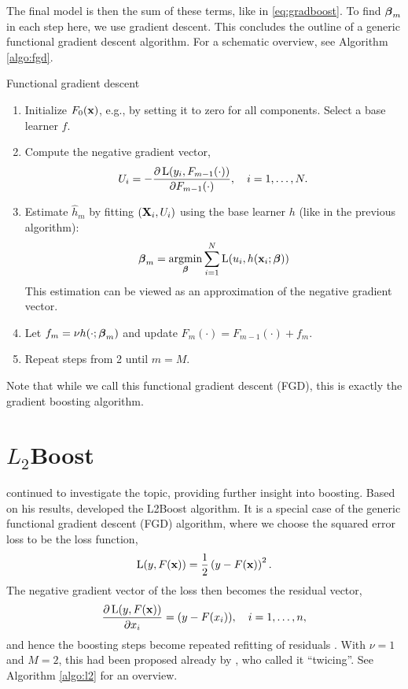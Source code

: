 The final model is then the sum of these terms, like in \eqref{eq:gradboost}. To find $\boldsymbol{\beta}_m$ in each step here, we use gradient descent. This concludes the outline of a generic functional gradient descent algorithm. For a schematic overview, see Algorithm \ref{algo:fgd}.
\begin{algorithm}
\caption{Functional gradient descent}
\label{algo:fgd}
\begin{enumerate}
    \item Initialize $F_0(\mathbf{x})$, e.g., by setting it to zero for all components. Select a base learner $f$.
    \item Compute the negative gradient vector,
        \begin{equation*}
            U_i=-\frac{\partial \operatorname{L}(y_i,F_{m-1}(\cdot))}{\partial F_{m-1}(\cdot)},\quad i=1,\dotsc,N.
        \end{equation*}
    \item Estimate $\hat{h}_m$ by fitting $(\mathbf{X}_i,U_i)$ using the base learner $h$ (like in the previous algorithm):
        \begin{equation*}
            \boldsymbol{\beta}_m=\operatorname*{argmin}_{\boldsymbol{\beta}}\sum_{i=1}^N\operatorname{L}(u_i,h(\mathbf{x}_i;\boldsymbol{\beta}))
        \end{equation*}
        This estimation can be viewed as an approximation of the negative gradient vector.
    \item Let $f_m=\nu h(\cdot;\boldsymbol{\beta}_m)$ and update $F_m(\cdot)=F_{m-1}(\cdot)+f_m$.
    \item Repeat steps from 2 until $m=M$.
\end{enumerate}
\end{algorithm}
Note that while we call this functional gradient descent (FGD), this is exactly the gradient boosting algorithm.

\section{$L_2$Boost}
\citet{friedman2001} continued to investigate the topic, providing further insight into boosting. Based on his results, \citet{buhlmann-yu} developed the L2Boost algorithm. It is a special case of the generic functional gradient descent (FGD) algorithm, where we choose the squared error loss to be the loss function,
\begin{equation*}
    \operatorname{L}(y,F(\mathbf{x}))=\frac{1}{2}\left(y-F(\mathbf{x})\right)^2.
\end{equation*}
The negative gradient vector of the loss then becomes the residual vector,
\begin{equation*}
    \frac{\partial\operatorname{L}(y,F(\mathbf{x}))}{\partial x_i}=(y-F(x_i)),\quad i=1,\dotsc,n,
\end{equation*}
and hence the boosting steps become repeated refitting of residuals \citep{friedman2001,buhlmann-yu}. With $\nu=1$ and $M=2$, this had been proposed already by \citep{tukey}, who called it ``twicing''. See Algorithm \ref{algo:l2} for an overview.

